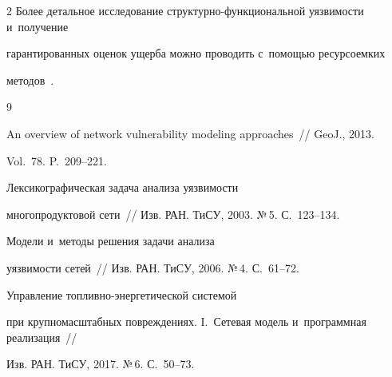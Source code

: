 \begin{multicols}{2}
Более детальное  исследование  струк\-тур\-но-функ\-цио\-наль\-ной уяз\-ви\-мости  и~получение 


гарантированных оценок ущерба можно проводить с~помощью ресурсоемких 


методов~\cite{MalInf17}. 





\vspace*{-6pt}








{\small\frenchspacing


 {%




 \begin{thebibliography}{9}





  


An overview of network vulnerability modeling approaches~// GeoJ., 2013. 


Vol.~78. P.~209--221.





  Лексикографическая задача анализа уязвимости


многопродуктовой сети~// Изв. РАН. \mbox{ТиСУ}, 2003. №\,5. С.~123--134.





  Модели и~методы решения задачи анализа


уязвимости сетей~// Изв. РАН. ТиСУ, 2006. №\,4. С.~61--72.





  


Управление   топ\-лив\-но-энер\-ге\-ти\-че\-ской  сис\-те\-мой  


при  крупномасштабных повреждениях. I.~Сетевая  модель  и~программная реализация~// 


Изв. РАН. ТиСУ, 2017. №\,6. С.~50--73.





  



\end{thebibliography}}}
\end{multicols}
